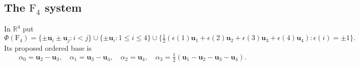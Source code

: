\documentclass[11pt]{amsart}
\newcommand\re{{\mathbb R}}%
\newcommand\Zu{{\mathbf u}}
\theoremstyle{definition}
\newcommand{\typ}[1]{\mathrm{#1}}
\begin{document}
\subsection{\texorpdfstring{The $\typ F_4$ system}{The F4 system}}

In $\re^4$ put
\begin{equation}\label{eq:F-roots}
 \Phi(\typ F_4)=\{\pm\Zu_i\pm\Zu_j:i<j\}
 \cup\{\pm\Zu_i:1\leq i\leq4\}
 \cup\{\tfrac12(\epsilon(1)\Zu_1+\epsilon(2)\Zu_2+
                    \epsilon(3)\Zu_3+\epsilon(4)\Zu_4):\epsilon(i)=\pm1\}.
\end{equation}
Its proposed ordered base is
\begin{equation}\label{eq:F-base}
 \alpha_0=\Zu_2-\Zu_3,\quad
 \alpha_1=\Zu_3-\Zu_4,\quad
 \alpha_2=\Zu_4,\quad
 \alpha_3=\tfrac12(\Zu_1-\Zu_2-\Zu_3-\Zu_4).
\end{equation}
\end{document}
